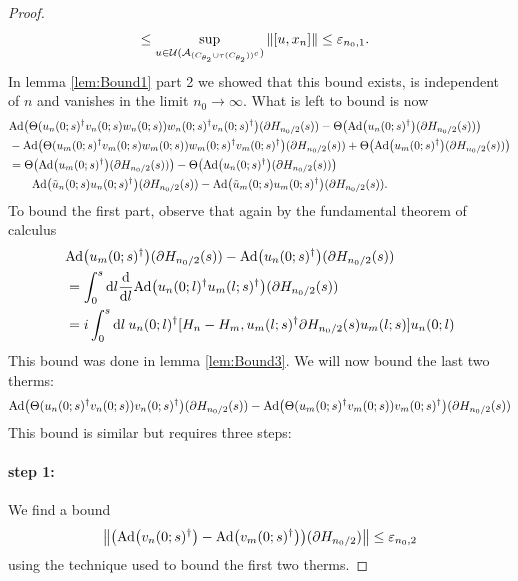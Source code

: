 \documentclass[12pt,a4paper,twoside]{article}
\renewcommand{\d}{\text{d}}
\let\originalleft\left
\let\originalright\right
\renewcommand{\left}{\mathopen{}\mathclose\bgroup\originalleft}
\renewcommand{\right}{\aftergroup\egroup\originalright}
\newcommand{\UU}{\mathcal U}
\renewcommand{\AA}{\mathcal A}
\newcommand{\Ad}[1]{\textrm{Ad}\left(#1\right)}
\theoremstyle{definition}
\numberwithin{equation}{section}
\begin{document}
\begin{proof}
\begin{align}
		&\leq \sup_{u\in\UU(\AA_{(C_{\theta_2}\cup \tau(C_{\theta_2}))^c})}\norm{[u,x_n]}\leq \varepsilon_{n_0,1}.
	\end{align}
	In lemma \ref{lem:Bound1} part 2 we showed that this bound exists, is independent of $n$ and vanishes in the limit $n_0\rightarrow\infty.$ What is left to bound is now
	\begin{align}
		&\Ad{\Theta(u_n(0;s)^\dagger v_n(0;s)w_n(0;s))w_n(0;s)^\dagger v_n(0;s)^\dagger}(\partial H_{n_0/2}(s))-\Theta\left(\Ad{u_n(0;s)^\dagger}(\partial H_{n_0/2}(s))\right)\\
		\nonumber
		&-\Ad{\Theta(u_m(0;s)^\dagger v_m(0;s)w_m(0;s))w_m(0;s)^\dagger v_m(0;s)^\dagger}(\partial H_{n_0/2}(s))+\Theta\left(\Ad{u_m(0;s)^\dagger}(\partial H_{n_0/2}(s))\right)\\
		&=\Theta\left(\Ad{u_m(0;s)^\dagger}(\partial H_{n_0/2}(s))\right)-\Theta\left(\Ad{u_n(0;s)^\dagger}(\partial H_{n_0/2}(s))\right)\\
		\nonumber
		&\qquad \Ad{\tilde{u}_n(0;s)u_n(0;s)^\dagger}(\partial H_{n_0/2}(s))-\Ad{\tilde{u}_m(0;s)u_m(0;s)^\dagger}(\partial H_{n_0/2}(s)).
	\end{align}
	To bound the first part, observe that again by the fundamental theorem of calculus
	\begin{align}
		&\Ad{u_m(0;s)^\dagger}(\partial H_{n_0/2}(s))-\Ad{u_n(0;s)^\dagger}(\partial H_{n_0/2}(s))\\
		&=\int_0^s\d l\frac{\d}{\d l}\Ad{u_n(0;l)^{\dagger}u_m(l;s)^{\dagger}}(\partial H_{n_0/2}(s))\\
		&=i\int_0^s\d l\: u_n(0;l)^{\dagger}[H_n-H_m,u_m(l;s)^{\dagger}\partial H_{n_0/2}(s)u_m(l;s)]u_n(0;l)
	\end{align}
	This bound was done in lemma \ref{lem:Bound3}. We will now bound the last two therms:
	\begin{align}
		\Ad{\Theta(u_n(0;s)^\dagger v_n(0;s)) v_n(0;s)^\dagger}(\partial H_{n_0/2}(s))-\Ad{\Theta(u_m(0;s)^\dagger v_m(0;s)) v_m(0;s)^\dagger}(\partial H_{n_0/2}(s))
	\end{align}
	This bound is similar but requires three steps:
	\paragraph{step 1:}We find a bound
	\begin{equation}
		\norm{\left(\Ad{v_n(0;s)^\dagger}-\Ad{v_m(0;s)^\dagger}\right)(\partial H_{n_0/2})}\leq \varepsilon_{n_0,2}
	\end{equation}
	using the technique used to bound the first two therms.

\end{proof}
\end{document}
